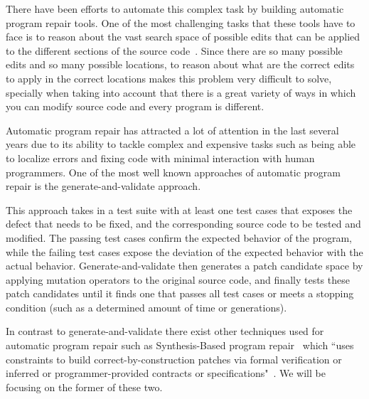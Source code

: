 \documentclass[conference]{IEEEtran}
\newcommand{\todo}[1]
  {{\scriptsize \textbf{\color{red} {#1}}}}
\begin{document}
There have been efforts to automate this complex task by 
building automatic program repair tools. One of the most challenging tasks that 
these tools have to face is to reason about the vast search space of possible 
edits that can be applied to the different sections of the source code~\cite{long16}. Since 
there are so many possible edits and so many possible locations, to reason about 
what are the correct edits to apply in the correct locations makes this problem 
very difficult to solve, specially when taking into account that there is a great variety of ways in which you can modify source code and every program is different.

Automatic program repair has attracted a lot of attention in the last several
years due to its ability to tackle complex and expensive tasks such as being
able to localize errors and fixing code with minimal interaction with human
programmers. One of the most well known approaches of automatic program repair
is the generate-and-validate approach. 

This approach takes in a test suite with at least one test cases that exposes the defect that needs to be fixed, and the corresponding source code to be tested and modified. The passing test cases confirm the
expected behavior of the program, while the failing test cases expose the
deviation of the expected behavior with the actual behavior. Generate-and-validate then generates a patch candidate space by applying mutation operators to the original source code, and finally tests these patch candidates until it finds one that passes all test cases or meets a stopping condition (such as a determined amount of time or generations). 


  
 In contrast to generate-and-validate there exist other techniques used for 
automatic program repair such as Synthesis-Based program 
repair~\cite{jin11,pei14} which ``uses constraints to build 
correct-by-construction patches via formal verification or inferred or 
programmer-provided contracts
or specifications"~\cite{smith15}. We will be focusing on the former of these 
two.
\end{document}
